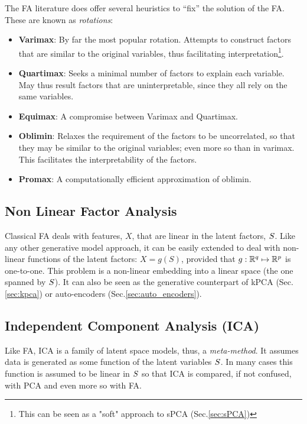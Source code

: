 \documentclass[12pt,a4paper]{article}
\begin{document}
The FA literature does offer several heuristics to ``fix'' the solution of the FA. 
These are known as \emph{rotations}:
\begin{itemize}
	\item \textbf{Varimax}: 
	By far the most popular rotation. Attempts to construct factors that are similar to the original variables, thus facilitating interpretation\footnote{This can be seen as a "soft" approach to sPCA (Sec.\ref{sec:sPCA})}.
	
	\item \textbf{Quartimax}: 
	Seeks a minimal number of factors to explain each variable. 
	May thus result factors that are uninterpretable, since they all rely on the same variables.
	
	\item \textbf{Equimax}: A compromise between Varimax and Quartimax. 
	
	\item \textbf{Oblimin}: 
	Relaxes the requirement of the factors to be uncorrelated, so that they may be similar to the original variables; even more so than in varimax. 
	This facilitates the interpretability of the factors. 
	
	\item \textbf{Promax}: 
	A computationally efficient approximation of oblimin.
\end{itemize}



\subsection{Non Linear Factor Analysis}
Classical FA deals with features, $X$, that are linear in the latent factors, $S$. 
Like any other generative model approach, it can be easily extended to deal with non-linear functions of the latent factors: $X=g(S)$, provided that $g:\mathbb{R}^q \mapsto \mathbb{R}^p$ is one-to-one. 
This problem is a non-linear embedding into a linear space (the one spanned by $S$).
It can also be seen as the generative counterpart of kPCA (Sec.\ref{sec:kpca}) or auto-encoders (Sec.\ref{sec:auto_encoders}).




\subsection{Independent Component Analysis (ICA)}
\label{sec:ica}


Like FA, ICA is a family of latent space models, thus, a \emph{meta-method}.
It assumes data is generated as some function of the latent variables $S$. 
In many cases this function is assumed to be linear in $S$ so that ICA is compared, if not confused, with PCA and even more so with FA. 
\end{document}
